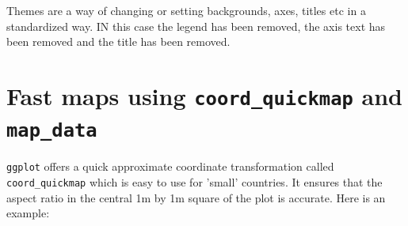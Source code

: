 \documentclass[titlepage]{book}\usepackage{knitr}
\begin{document}
\begin{knitrout}
\color{fgcolor}\begin{kframe}
\begin{alltt}
 \hlkwb{<-} \hlstd{(}  \hlstd{(}   
  \hlopt{+}
\hlstd{()} \hlopt{+}
\hlstd{(} \hlstd{=} \hlstd{)} \hlopt{+}
\hlstd{(} \hlstd{=} \hlstd{)} \hlopt{+}
\hlstd{()} \hlopt{+}
\hlstd{(} \hlstd{=} \hlstd{,}  \hlstd{=} \hlstd{(),}
 \hlstd{=} \hlstd{())}
\end{alltt}
\end{kframe}
\end{knitrout}

Themes are a way of changing or setting backgrounds, axes, titles etc in a standardized way. IN this case the legend has been removed, the axis text has been removed and the title has been removed.

\section{Fast maps using \texttt{coord\_quickmap} and \texttt{map\_data}}

    \texttt{ggplot} offers a quick approximate coordinate transformation called \texttt{coord\_quickmap} which is easy to use for 'small' countries.  It ensures that the aspect ratio in the central 1m by 1m square of the plot is accurate. Here is an example:
    
\begin{knitrout}
\color{fgcolor}\begin{kframe}
\begin{alltt}
 \hlkwb{<-} \hlstd{(}\hlstd{(}\hlstd{),}    \hlopt{+}
  \hlstd{(} \hlstd{=} \hlstd{,}  \hlstd{=} \hlstd{)} \hlopt{+}
  \hlstd{(}\hlstd{)} \hlopt{+} \hlstd{(}\hlstd{)}
   \hlopt{+} \hlstd{(}\hlstd{)}
\end{alltt}
\end{kframe}
\end{knitrout}
    
\end{document}
